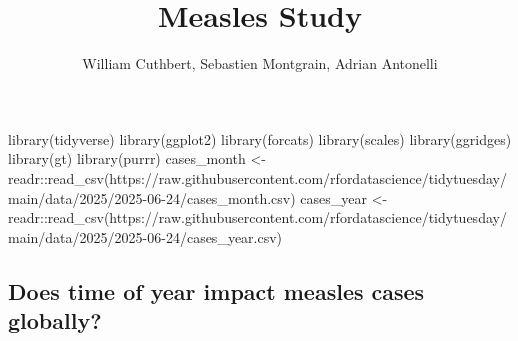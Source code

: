 \documentclass[
  letterpaper,
  DIV=11,
  numbers=noendperiod]{scrartcl}
\title{Measles Study}
\author{William Cuthbert, Sebastien Montgrain, Adrian Antonelli}
\date{}
\newenvironment{Shaded}{\begin{snugshade}}{\end{snugshade}}
\newcommand{\FunctionTok}[1]{\textcolor[rgb]{0.28,0.35,0.67}{#1}}
\newcommand{\NormalTok}[1]{\textcolor[rgb]{0.00,0.23,0.31}{#1}}
\newcommand{\OtherTok}[1]{\textcolor[rgb]{0.00,0.23,0.31}{#1}}
\newcommand{\SpecialCharTok}[1]{\textcolor[rgb]{0.37,0.37,0.37}{#1}}
\newcommand{\StringTok}[1]{\textcolor[rgb]{0.13,0.47,0.30}{#1}}
\renewcommand*\contentsname{Table of contents}
\newcommand\contentsname{Table of contents}
\begin{document}
\maketitle

\renewcommand*\contentsname{Table of Contents}
{
\setcounter{tocdepth}{3}
\tableofcontents
}

\begin{Shaded}
\begin{Highlighting}[]
\FunctionTok{library}\NormalTok{(tidyverse)}
\FunctionTok{library}\NormalTok{(ggplot2)}
\FunctionTok{library}\NormalTok{(forcats)}
\FunctionTok{library}\NormalTok{(scales)}
\FunctionTok{library}\NormalTok{(ggridges)}
\FunctionTok{library}\NormalTok{(gt)}
\FunctionTok{library}\NormalTok{(purrr)}
\NormalTok{cases\_month }\OtherTok{\textless{}{-}}\NormalTok{ readr}\SpecialCharTok{::}\FunctionTok{read\_csv}\NormalTok{(}\StringTok{\textquotesingle{}https://raw.githubusercontent.com/rfordatascience/tidytuesday/main/data/2025/2025{-}06{-}24/cases\_month.csv\textquotesingle{}}\NormalTok{)}
\NormalTok{cases\_year }\OtherTok{\textless{}{-}}\NormalTok{ readr}\SpecialCharTok{::}\FunctionTok{read\_csv}\NormalTok{(}\StringTok{\textquotesingle{}https://raw.githubusercontent.com/rfordatascience/tidytuesday/main/data/2025/2025{-}06{-}24/cases\_year.csv\textquotesingle{}}\NormalTok{)}
\end{Highlighting}
\end{Shaded}

\subsection{Does time of year impact measles cases
globally?}\label{does-time-of-year-impact-measles-cases-globally}
\end{document}
